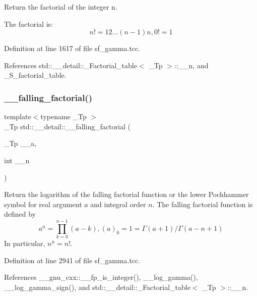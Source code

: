 Return the factorial of the integer n. 

The factorial is\+: \[ n! = 1 2 ... (n-1) n, 0! = 1 \] 

Definition at line 1617 of file sf\+\_\+gamma.\+tcc.



References std\+::\+\_\+\+\_\+detail\+::\+\_\+\+Factorial\+\_\+table$<$ \+\_\+\+Tp $>$\+::\+\_\+\+\_\+n, and \+\_\+\+S\+\_\+factorial\+\_\+table.

\mbox{\label{namespacestd_1_1____detail_a62ddf0f8d9467f4c3f2cc0b500ca1272}} 
\subsubsection{\texorpdfstring{\+\_\+\+\_\+falling\+\_\+factorial()}{\_\_falling\_factorial()}\hspace{0.1cm}{\footnotesize\ttfamily [1/2]}}
{\footnotesize\ttfamily template$<$typename \+\_\+\+Tp $>$ \\
\+\_\+\+Tp std\+::\+\_\+\+\_\+detail\+::\+\_\+\+\_\+falling\+\_\+factorial (\begin{DoxyParamCaption}\item[{\+\_\+\+Tp}]{\+\_\+\+\_\+a,  }\item[{int}]{\+\_\+\+\_\+n }\end{DoxyParamCaption})}



Return the logarithm of the falling factorial function or the lower Pochhammer symbol for real argument $ a $ and integral order $ n $. The falling factorial function is defined by \[ a^{\underline{n}} = \prod_{k=0}^{n-1} (a - k), (a)_0 = 1 = \Gamma(a + 1) / \Gamma(a - n + 1) \] In particular, $ n^{\underline{n}} = n! $. 



Definition at line 2941 of file sf\+\_\+gamma.\+tcc.



References \+\_\+\+\_\+gnu\+\_\+cxx\+::\+\_\+\+\_\+fp\+\_\+is\+\_\+integer(), \+\_\+\+\_\+log\+\_\+gamma(), \+\_\+\+\_\+log\+\_\+gamma\+\_\+sign(), and std\+::\+\_\+\+\_\+detail\+::\+\_\+\+Factorial\+\_\+table$<$ \+\_\+\+Tp $>$\+::\+\_\+\+\_\+n.



